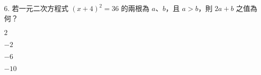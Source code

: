 \documentclass[12pt]{article}
\begin{document}
\begin{problem}
  \item[6.] 若一元二次方程式 $(x + 4)^2 = 36$ 的兩根為 $a$、$b$，且 $a > b$，則 $2a + b$ 之值為何？
  \begin{choices}
    \item $2$
    \item $-2$
    \item $-6$
    \item $-10$
  \end{choices}
\end{problem}
\end{document}
